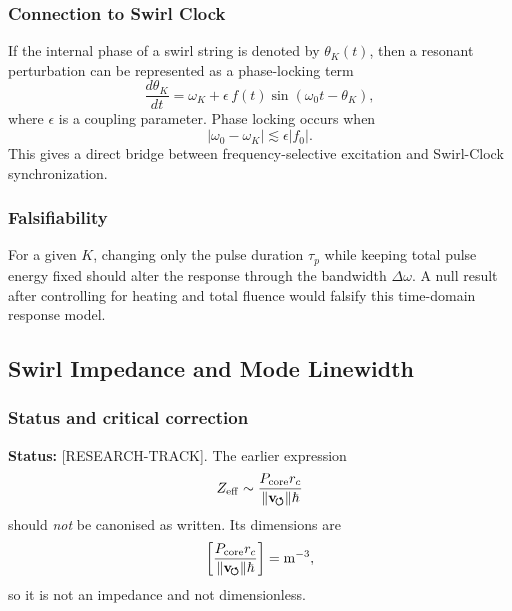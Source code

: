     \subsubsection*{Connection to Swirl Clock}
        
        If the internal phase of a swirl string is denoted by \(\theta_K(t)\), then a resonant perturbation can be represented as a phase-locking term
        \begin{equation}
            \frac{d\theta_K}{dt}
            =
            \omega_K
            +
            \epsilon\,f(t)\sin(\omega_0 t-\theta_K),
            \label{eq:phase_locking_response}
        \end{equation}
        where \(\epsilon\) is a coupling parameter. Phase locking occurs when
        \begin{equation}
            |\omega_0-\omega_K| \lesssim \epsilon |f_0|.
            \label{eq:locking_condition}
        \end{equation}
        This gives a direct bridge between frequency-selective excitation and Swirl-Clock synchronization.
    
    \subsubsection*{Falsifiability}
        
        For a given \(K\), changing only the pulse duration \(\tau_p\) while keeping total pulse energy fixed should alter the response through the bandwidth \(\Delta\omega\). A null result after controlling for heating and total fluence would falsify this time-domain response model.

\subsection{Swirl Impedance and Mode Linewidth}
    \label{app:swirl-impedance-linewidth}
    
    \subsubsection*{Status and critical correction}
        
        \noindent
        \textbf{Status:} [RESEARCH-TRACK].
        The earlier expression
        \[
            Z_{\mathrm{eff}} \sim \frac{P_{\mathrm{core}}r_c}{\lVert\mathbf{v}_{\!\boldsymbol{\circlearrowleft}}\rVert\hbar}
        \]
        should \emph{not} be canonised as written. Its dimensions are
        \[
            \left[
                \frac{P_{\mathrm{core}}r_c}{\lVert\mathbf{v}_{\!\boldsymbol{\circlearrowleft}}\rVert\hbar}
            \right]
            =
            \mathrm{m^{-3}},
        \]
        so it is not an impedance and not dimensionless.
        
